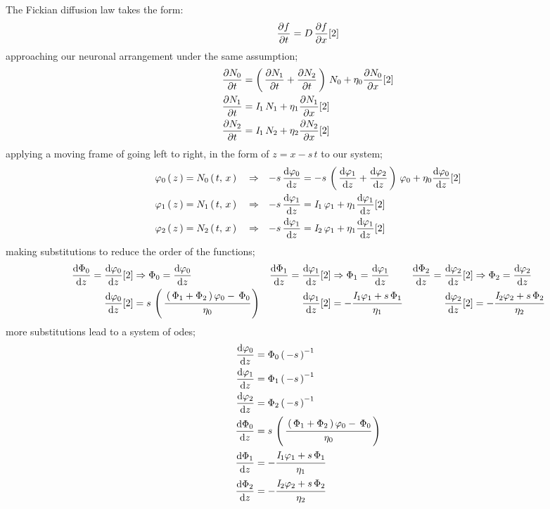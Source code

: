 \documentclass[class={myRUCProject}, crop=false]{standalone}
\begin{document}
The Fickian diffusion law takes the form:
\begin{equation}
    \pde{t}{f} = D\,\pde{x}{f}[2]
\end{equation}
approaching our neuronal arrangement under the same assumption;
\begin{align}
    \pde{t}{N_0} &= \br{\pde{t}{N_1}+\pde{t}{N_2}}\,N_0 + \eta_0\pde{x}{N_0}[2] \\
    \pde{t}{N_1} &= \curr_1\,N_1 + \eta_1\pde{x}{N_1}[2] \\
    \pde{t}{N_2} &= \curr_1\,N_2 + \eta_2\pde{x}{N_2}[2] 
\end{align}
applying a moving frame of going left to right, in the form of \(z=x-s\,t\) to our system;
\begin{align}
    \varphi_0\br{z} &= N_0\br{t,\,x} &&\implies& -s\,\ode[z]{\varphi_0} &= -s\,\br{\ode[z]{\varphi_1}+\ode[z]{\varphi_2}}\,\varphi_0 + \eta_0\ode[z]{\varphi_0}[2] \\
    \varphi_1\br{z} &= N_1\br{t,\,x} &&\implies& -s\,\ode[z]{\varphi_1} &= \curr_1\,\varphi_1 + \eta_1\ode[z]{\varphi_1}[2] \\
    \varphi_2\br{z} &= N_2\br{t,\,x} &&\implies& -s\,\ode[z]{\varphi_1} &= \curr_2\,\varphi_1 + \eta_1\ode[z]{\varphi_1}[2] 
\end{align}
making substitutions to reduce the order of the functions;
\begin{align*}
    \ode[z]{\Phi_0} = \ode[z]{\varphi_0}[2] &\implies \Phi_0 = \ode[z]{\varphi_0} &
    \ode[z]{\Phi_1} = \ode[z]{\varphi_1}[2] &\implies \Phi_1 = \ode[z]{\varphi_1} &
    \ode[z]{\Phi_2} = \ode[z]{\varphi_2}[2] &\implies \Phi_2 = \ode[z]{\varphi_2}\\
    \ode[z]{\varphi_0}[2] &= s\,\br{\cfrac{\br{\Phi_1+\Phi_2}\varphi_0 - \,\Phi_0}{\eta_0}} &
    \ode[z]{\varphi_1}[2] &= -\cfrac{\curr_1 \varphi_1 + s \,\Phi_1}{\eta_1} &
    \ode[z]{\varphi_2}[2] &= -\cfrac{\curr_2 \varphi_2 + s \,\Phi_2}{\eta_2} 
\end{align*}
more substitutions lead to a system of \glspl{ode};
\begin{align}
    \ode[z]{\varphi_0} &= {\Phi_0}\br{-s}^{-1} \\
    \ode[z]{\varphi_1} &= {\Phi_1}\br{-s}^{-1} \\
    \ode[z]{\varphi_2} &= {\Phi_2}\br{-s}^{-1} \\
    \ode[z]{\Phi_0} &= s\,\br{\cfrac{\br{\Phi_1+\Phi_2}\varphi_0 - \,\Phi_0}{\eta_0}} \\
    \ode[z]{\Phi_1} &= -\cfrac{\curr_1 \varphi_1 + s \,\Phi_1}{\eta_1}\\
    \ode[z]{\Phi_2} &= -\cfrac{\curr_2 \varphi_2 + s \,\Phi_2}{\eta_2}
\end{align}
\end{document}
